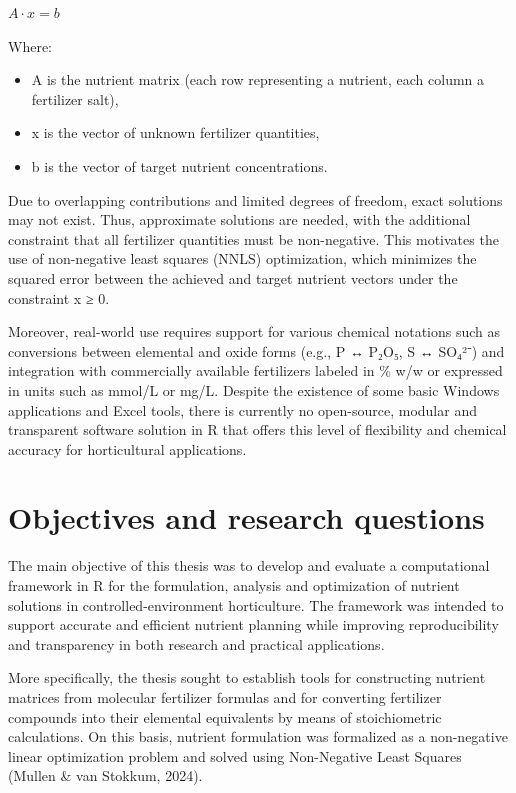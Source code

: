 \documentclass[
  letterpaper,
  DIV=11,
  numbers=noendperiod]{scrreprt}
\begin{document}
\(A·x = b\)

Where:

\begin{itemize}
\item
  A is the nutrient matrix (each row representing a nutrient, each
  column a fertilizer salt),
\item
  x is the vector of unknown fertilizer quantities,
\item
  b is the vector of target nutrient concentrations.
\end{itemize}

Due to overlapping contributions and limited degrees of freedom, exact
solutions may not exist. Thus, approximate solutions are needed, with
the additional constraint that all fertilizer quantities must be
non-negative. This motivates the use of non-negative least squares
(NNLS) optimization, which minimizes the squared error between the
achieved and target nutrient vectors under the constraint x ≥ 0.

Moreover, real-world use requires support for various chemical notations
such as conversions between elemental and oxide forms (e.g., P ↔ P₂O₅, S
↔ SO₄²⁻) and integration with commercially available fertilizers labeled
in \% w/w or expressed in units such as mmol/L or mg/L. Despite the
existence of some basic Windows applications and Excel tools, there is
currently no open-source, modular and transparent software solution in R
that offers this level of flexibility and chemical accuracy for
horticultural applications.

\section{Objectives and research
questions}\label{objectives-and-research-questions}

The main objective of this thesis was to develop and evaluate a
computational framework in R for the formulation, analysis and
optimization of nutrient solutions in controlled-environment
horticulture. The framework was intended to support accurate and
efficient nutrient planning while improving reproducibility and
transparency in both research and practical applications.

More specifically, the thesis sought to establish tools for constructing
nutrient matrices from molecular fertilizer formulas and for converting
fertilizer compounds into their elemental equivalents by means of
stoichiometric calculations. On this basis, nutrient formulation was
formalized as a non-negative linear optimization problem and solved
using Non-Negative Least Squares (Mullen \& van Stokkum, 2024).
\end{document}
